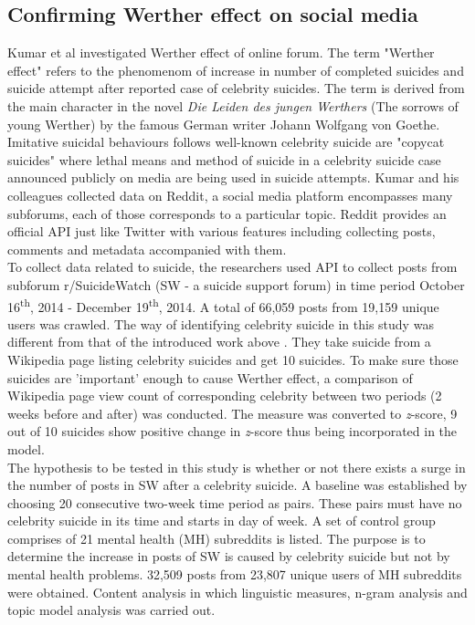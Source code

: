 \subsection{Confirming Werther effect on social media}
Kumar et al \cite{Kumar2015a} investigated Werther effect of online forum. The term "Werther effect" refers to the phenomenom of increase in number of completed suicides and suicide attempt after reported case of celebrity suicides. The term is derived from the main character in the novel \textit{Die Leiden des jungen Werthers} (The sorrows of young Werther) by the famous German writer Johann Wolfgang von Goethe. Imitative suicidal behaviours follows well-known celebrity suicide are "copycat suicides" where lethal means and method of suicide in a celebrity suicide case announced publicly on media are being used in suicide attempts. Kumar and his colleagues collected data on Reddit, a social media platform encompasses many subforums, each of those corresponds to a particular topic. Reddit provides an official API just like Twitter with various features including collecting posts, comments and metadata accompanied with them.\\
To collect data related to suicide, the researchers used API to collect posts from subforum r/SuicideWatch (SW - a suicide support forum) in time period October 16\textsuperscript{th}, 2014 - December 19\textsuperscript{th}, 2014. A total of 66,059 posts from 19,159 unique users was crawled. The way of identifying celebrity suicide in this study was different from that of the introduced work above \cite{Won2013}. They take suicide from a Wikipedia page listing celebrity suicides and get 10 suicides. To make sure those suicides are 'important' enough to cause Werther effect, a comparison of Wikipedia page view count of corresponding celebrity between two periods (2 weeks before and after) was conducted. The measure was converted to \textit{z}-score, 9 out of 10 suicides show positive change in \textit{z}-score thus being incorporated in the model. \\
The hypothesis to be tested in this study is whether or not there exists a surge in the number of posts in SW after a celebrity suicide. A baseline was established by choosing 20 consecutive two-week time period as pairs. These pairs must have no celebrity suicide in its time and starts in day of week. A set of control group comprises of 21 mental health (MH) subreddits is listed. The purpose is to determine the increase in posts of SW is caused by celebrity suicide but not by mental health problems. 32,509 posts from 23,807 unique users of MH subreddits were obtained. Content analysis in which linguistic measures, n-gram analysis and topic model analysis was carried out.\\
